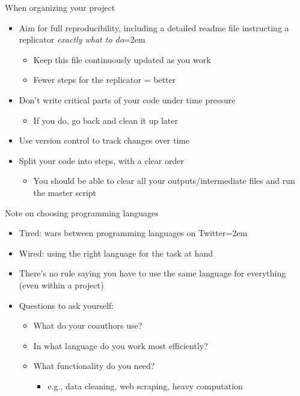 \documentclass{beamer}
\begin{document}
\begin{frame}{When organizing your project}
    \begin{itemize}
        \item Aim for full reproducibility, including a detailed readme file instructing a replicator \textit{exactly what to do}\itemsep=2em
        \begin{itemize}
            \item Keep this file continuously updated as you work
            \item Fewer steps for the replicator = better
        \end{itemize}
        \item Don't write critical parts of your code under time pressure
        \begin{itemize}
            \item If you do, go back and clean it up later
        \end{itemize}
        \item Use version control to track changes over time
        \item Split your code into steps, with a clear order
        \begin{itemize}
            \item You should be able to clear all your outputs/intermediate files and run the master script
        \end{itemize}
    \end{itemize}
\end{frame}

\begin{frame}{Note on choosing programming languages}
    \begin{itemize}
        \item Tired: wars between programming languages on Twitter\itemsep=2em
        \item Wired: using the right language for the task at hand
        \item There's no rule saying you have to use the same language for everything (even within a project)
        \item Questions to ask yourself:
        \begin{itemize}
            \item What do your coauthors use?
            \item In what language do you work most efficiently?
            \item What functionality do you need?
            \begin{itemize}
                \item e.g., data cleaning, web scraping, heavy computation
            \end{itemize}
        \end{itemize}
    \end{itemize}
\end{frame}
\end{document}
